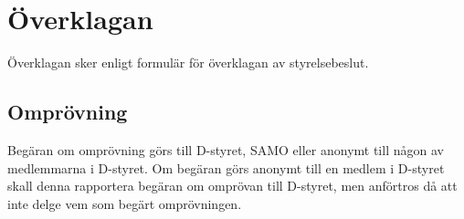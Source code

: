 \documentclass{dtek}
\begin{document}
\section{Överklagan}
Överklagan sker enligt formulär för överklagan av styrelsebeslut.
\subsection{Omprövning}
  Begäran om omprövning görs till D-styret, SAMO eller anonymt till någon av medlemmarna i D-styret. Om begäran görs anonymt till en medlem i D-styret skall denna rapportera begäran om omprövan till D-styret, men anförtros då att inte delge vem som begärt omprövningen.
\end{document}
